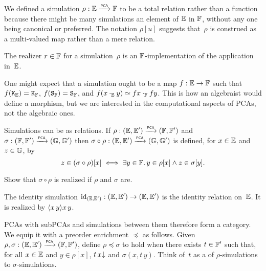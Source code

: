 We defined a simulation $\rho : \EE \pcato \FF$ to be a total relation rather than a function because there might be many simulations an element of $\EE$ in $\FF$, without any one being canonical or preferred. The notation $\rho[u]$ suggests that~$\rho$ is construed as a multi-valued map rather than a mere relation.

The realizer $r \in \FF$ for a simulation~$\rho$ is an $\FF$-implementation of the application in~$\EE$.

One might expect that a simulation ought to be a map $f : \EE \to \FF$ such that $f(\combK_\EE) = \combK_\FF$, $f(\combS_\FF) = \combS_\FF$, and $f (x \cdot_\EE y) \kleq f x \cdot_\FF f y$. This is how an algebraist would define a morphism, but we are interested in the computational aspects of PCAs, not the algebraic ones.

%
%
%
Simulations can be  as relations.
If $\rho: (\EE, \subEE) \pcato (\FF, \subFF)$ and $\sigma: (\FF,
\subFF) \pcato (\GG, \subGG)$ then $\sigma \circ \rho: (\EE, \subEE)
\pcato (\GG, \subGG)$ is defined, for $x \in \EE$ and $z \in \GG$, by
%
\begin{equation*}
  z \in (\sigma \circ \rho)[x]
  \iff
  \some{y \in \FF} y \in \rho[x] \land z \in \sigma[y].
\end{equation*}

\begin{exercise}
  Show that $\sigma \circ \rho$ is realized if $\rho$ and $\sigma$ are.
\end{exercise}

The identity simulation $\id[(\EE, \subEE)]: (\EE,
\subEE) \to (\EE, \subEE)$ is the identity relation on~$\EE$. It is realized by $\pcalam{x\,y} x \, y$.

PCAs with subPCAs and simulations between them therefore form a category. We equip it with a preorder enrichment $\preceq$ as follows.
%
%
%
%
%
Given $\rho, \sigma : (\EE, \subEE) \pcato (\FF, \subFF)$, define $\rho \preceq \sigma$ to hold when
there exists $t \in \subFF$ such that, for all $x \in \EE$ and $y \in \rho[x]$, $\defined{t \, x}$ and $\sigma(x, t \, y)$.
Think of~$t$ as a  of $\rho$-simulations to
$\sigma$-simulations.

